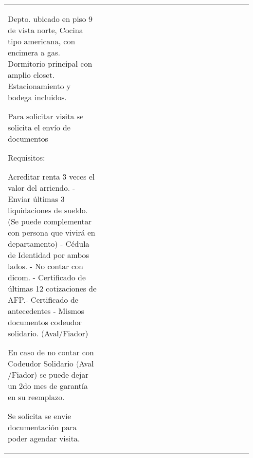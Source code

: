 \begin{table}[H]
\begin{tabular}{llllllllllrrrrllllrr}
Depto. ubicado en piso 9 de vista norte,
Cocina tipo americana, con encimera a gas.
Dormitorio principal con amplio closet.
Estacionamiento y bodega incluidos.

Para solicitar visita se solicita el envío de documentos

Requisitos:

Acreditar renta 3 veces el valor del arriendo. 
-Enviar últimas 3 liquidaciones de sueldo. (Se puede complementar con persona que vivirá en departamento)
- Cédula de Identidad por ambos lados.
- No contar con dicom.
- Certificado de últimas 12 cotizaciones de AFP.- Certificado de antecedentes
- Mismos documentos codeudor solidario. (Aval/Fiador)

En caso de no contar con Codeudor Solidario (Aval /Fiador) se puede dejar un 2do mes de garantía en su reemplazo.

Se solicita se envíe documentación para poder agendar visita.



\end{tabular}
\end{table}
